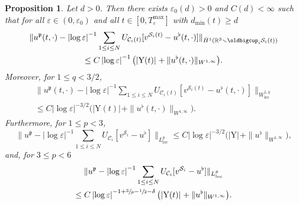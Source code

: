 \documentclass[JEP,XML,SOM,Unicode, NoEqCountersInSection,NoFloatCountersInSection,published]{cedram}
\newcommand{\R}{\mathbb{R}}
\let\eps\varepsilon
\newcommand{\loc}{\mathrm{loc}}
\newcommand{\rY}{\mathrm{Y}}
\newtheorem{Proposition}[thm]{Proposition}
\theoremstyle{definition}
\theoremstyle{remark}
\begin{document}
\begin{Proposition} \label{pro:u^p.U}
Let $d>0$. Then there exists $\eps_0(d) > 0$ and $C(d) < \infty$ such that for all $\eps \in (0,\eps_0)$ and all $t \in [0,T_\eps^{\max}]$
with $d_{\min}(t) \geq d$
\begin{multline} \label{est:fluid.velocities.-1}
\|u^\mathfrak{p}(t,\cdot) - \left|\log \eps\right|^{-1} \sum_{1 \leq i \leq N} U_{\mathcal C_i(t)}[v^{{\mathcal S}_i(t)} - u^\flat(t,\cdot)]\|_{\dot H^{1} (\R^3 \smallsetminus \oldbigcup_i {\mathcal S}_i(t)) }
\\
\leq C \left|\log \eps\right|^{-1} \big(|\rY(t)|_{} + \|u^\flat(t,\cdot)\|_{W^{1,\infty}} \big).
\end{multline}
Moreover, for $1 \leq q < 3/2$,
\begin{multline} \label{est:fluid.velocities.0}
\|u^\mathfrak{p}(t,\cdot) - \left|\log \eps\right|^{-1} \sum_{1 \leq i \leq N} U_{\mathcal C_i(t)}[v^{{\mathcal S}_i(t)} - u^\flat(t,\cdot)]\|_{W^{1,q}_{\loc}}
\\ \leq C \left|\log \eps\right|^{-3/2} \big(|\rY(t)|_{} + \|u^\flat(t,\cdot)\|_{W^{1,\infty}} \big).
\end{multline}
Furthermore, for $1 \leq p< 3$,
\begin{equation} \label{est:fluid.velocities.1}
\|u^\mathfrak{p} - \left|\log \eps\right|^{-1} \sum_{1 \leq i \leq N} U_{\mathcal C_i}[v^{{\mathcal S}_i} - u^\flat]\|_{L^p_{\loc}} \leq C \left|\log \eps\right|^{-3/2} \big(|\rY|_{} + \|u^\flat\|_{W^{1,\infty}} \big),
\end{equation}
and, for $3 \leq p < 6$
\begin{multline} \label{est:fluid.velocities.comment}
\|u^\mathfrak{p} - \left|\log \eps\right|^{-1} \sum_{1 \leq i \leq N} U_{\mathcal C_i}[v^{{\mathcal S}_i} - u^\flat]\|_{L^p_{\loc}}\\
\leq C \left|\log \eps\right|^{-1 + {\sfrac 3 p - \sfrac 1 2 - \delta}} \big(|\rY(t)|_{} + \|u^\flat\|_{W^{1,\infty}} \big).
\end{multline}
\end{Proposition}
\end{document}
